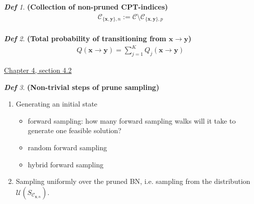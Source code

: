 \documentclass{amsart}
\theoremstyle{plain}
\theoremstyle{remark}
\newtheorem*{definition*}{\textbf{\em Def}}
\theoremstyle{plain}
\newcommand{\C}{{\mathcal C}}
\newcommand{\U}{{\mathcal{U}}}
\newcommand{\bfx}{{\mathbf{x}}}
\newcommand{\bfy}{{\mathbf{y}}}
\newcommand{\vs}{\vspace{0.75pc}}
\begin{document}
\begin{definition*}\textbf{ (Collection of non-pruned CPT-indices) }
\begin{align*}
\C_{\{\bfx,\bfy\},n}:=\C \setminus \C_{\{\bfx,\bfy\},p}\\
\end{align*}
\end{definition*}\vs 

\begin{definition*}\textbf{ (Total probability of transitioning from $\bfx \to \bfy$) }
\begin{align*}
Q(\bfx \to \bfy) = \sum_{j=1}^K Q_j(\bfx \to \bfy)
\end{align*}
\end{definition*}\vs 

\underline{Chapter 4, section 4.2} \\
\begin{definition*}\textbf{ (Non-trivial steps of prune sampling) }
\begin{enumerate}[1)]
\item Generating an initial state
\begin{itemize}
\item forward sampling: how many forward sampling walks will it take to generate one feasible solution?
\item random forward sampling
\item hybrid forward sampling 
\end{itemize}
\item Sampling uniformly over the pruned BN, i.e. sampling from the distribution $\U(S_{\C_{\bfx,n}})$.
\end{enumerate}
\end{definition*}\vspace{2pc} 
\end{document}
